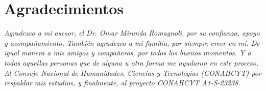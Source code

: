 \chapter*{Agradecimientos}

\textit{Agradezco a mi asesor, el Dr. Omar Miranda Romagnoli, por su confianza, apoyo y acompañamiento. También agradezco a mi familia, por siempre creer en mí. De igual manera a mis amigos y compañeros, por todos los buenos momentos. Y a todas aquellas personas que de alguna u otra forma me ayudaron en este proceso.\\
Al Consejo Nacional de Humanidades, Ciencias y Tecnologías (CONAHCYT) por respaldar mis estudios, y finalmente, al proyecto CONAHCYT A1-S-23238.}